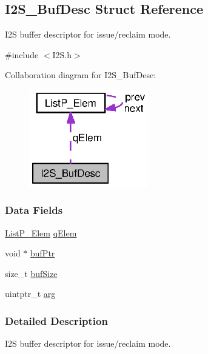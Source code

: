 \subsection{I2\+S\+\_\+\+Buf\+Desc Struct Reference}
\label{struct_i2_s___buf_desc}


I2\+S buffer descriptor for issue/reclaim mode.  




{\ttfamily \#include $<$I2\+S.\+h$>$}



Collaboration diagram for I2\+S\+\_\+\+Buf\+Desc\+:
\nopagebreak
\begin{figure}[H]
\begin{center}
\leavevmode
\includegraphics[width=147pt]{struct_i2_s___buf_desc__coll__graph}
\end{center}
\end{figure}
\subsubsection*{Data Fields}
\begin{DoxyCompactItemize}
\item 
\hyperlink{struct_list_p___elem}{List\+P\+\_\+\+Elem} \hyperlink{struct_i2_s___buf_desc_a0d0512ad9692e7eb4d486c1238cb75ce}{q\+Elem}
\item 
void $\ast$ \hyperlink{struct_i2_s___buf_desc_a63edcc97dba1524e4a63a055a6face33}{buf\+Ptr}
\item 
size\+\_\+t \hyperlink{struct_i2_s___buf_desc_a2d650ead8a0d337cb4d292e52e1a02c5}{buf\+Size}
\item 
uintptr\+\_\+t \hyperlink{struct_i2_s___buf_desc_a572be4bbbf39c6d7a0745829684676e1}{arg}
\end{DoxyCompactItemize}


\subsubsection{Detailed Description}
I2\+S buffer descriptor for issue/reclaim mode. 

